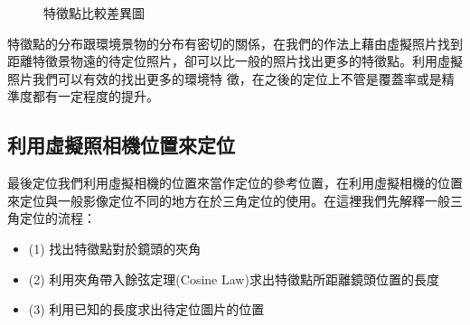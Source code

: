 	\begin{figure}
    	\begin{center}
    	\end{center}
    	\caption{特徵點比較差異圖 }
    	\label{fig:SIFT_Descriptor}
    \end{figure}
	
	特徵點的分布跟環境景物的分布有密切的關係，在我們的作法上藉由虛擬照片找到距離特徵景物遠的待定位照片，卻可以比一般的照片找出更多的特徵點。利用虛擬照片我們可以有效的找出更多的環境特
	徵，在之後的定位上不管是覆蓋率或是精準度都有一定程度的提升。

\subsection{利用虛擬照相機位置來定位}

	最後定位我們利用虛擬相機的位置來當作定位的參考位置，在利用虛擬相機的位置來定位與一般影像定位不同的地方在於三角定位的使用。在這裡我們先解釋一般三角定位的流程：
	\begin{itemize}
			\item (1) 找出特徵點對於鏡頭的夾角
    		\item (2) 利用夾角帶入餘弦定理(Cosine Law)求出特徵點所距離鏡頭位置的長度
    		\item (3) 利用已知的長度求出待定位圖片的位置
	\end{itemize}
	

